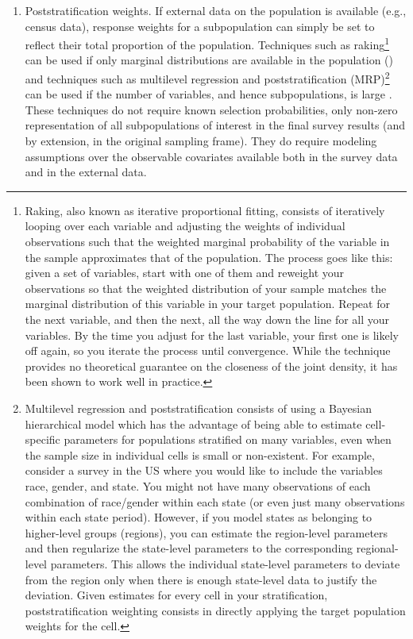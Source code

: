 \documentclass[a4paper,12pt]{article}
\theoremstyle{proposition}
\begin{document}
\begin{enumerate}
\item Poststratification weights. If external data on the population is available (e.g., census data), response weights for a subpopulation can simply be set to reflect their total proportion of the population. Techniques such as raking\footnote{Raking, also known as iterative proportional fitting, consists of iteratively looping over each variable and adjusting the weights of individual observations such that the weighted marginal probability of the variable in the sample approximates that of the population. The process goes like this: given a set of variables, start with one of them and reweight your observations so that the weighted distribution of your sample matches the marginal distribution of this variable in your target population. Repeat for the next variable, and then the next, all the way down the line for all your variables. By the time you adjust for the last variable, your first one is likely off again, so you iterate the process until convergence. While the technique provides no theoretical guarantee on the closeness of the joint density, it has been shown to work well in practice.} can be used if only marginal distributions are available in the population (\cite{Deville1992,Battaglia2009}) and techniques such as multilevel regression and poststratification (MRP)\footnote{Multilevel regression and poststratification consists of using a Bayesian hierarchical model which has the advantage of being able to estimate cell-specific parameters for populations stratified on many variables, even when the sample size in individual cells is small or non-existent. For example, consider a survey in the US where you would like to include the variables race, gender, and state. You might not have many observations of each combination of race/gender within each state (or even just many observations within each state period). However, if you model states as belonging to higher-level groups (regions), you can estimate the region-level parameters and then regularize the state-level parameters to the corresponding regional-level parameters. This allows the individual state-level parameters to deviate from the region only when there is enough state-level data to justify the deviation. Given estimates for every cell in your stratification, poststratification weighting consists in directly applying the target population weights for the cell.} can be used if the number of variables, and hence subpopulations, is large \parencite{Gelman1997}. These techniques do not require known selection probabilities, only non-zero representation of all subpopulations of interest in the final survey results (and by extension, in the original sampling frame). They do require modeling assumptions over the observable covariates available both in the survey data and in the external data.

\end{enumerate}
\end{document}
